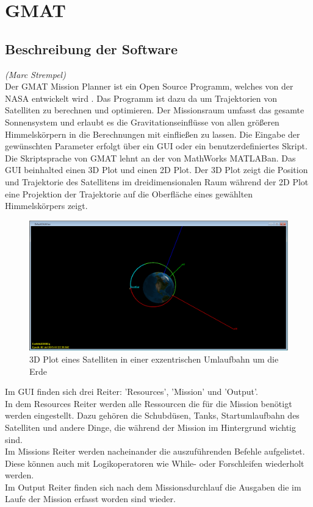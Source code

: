 			
\section{GMAT}
		\subsection{Beschreibung der Software}
		\hfill\emph{(Marc Strempel)}\\
Der GMAT Mission Planner ist ein Open Source Programm, welches von der NASA entwickelt wird \cite{Hughes.}. Das Programm ist dazu da um Trajektorien von Satelliten zu berechnen und optimieren. Der Missionsraum umfasst das gesamte Sonnensystem und erlaubt es die Gravitationseinflüsse von allen größeren Himmelskörpern in die Berechnungen mit einfließen zu lassen. 
Die Eingabe der gewünschten Parameter erfolgt über ein GUI oder ein benutzerdefiniertes Skript. Die Skriptsprache von GMAT lehnt an der von MathWorks MATLAB\textregistered \space an.
Das GUI beinhalted einen 3D Plot und einen 2D Plot. Der 3D Plot zeigt die Position und Trajektorie des Satellitens im dreidimensionalen Raum während der 2D Plot eine Projektion der Trajektorie auf die Oberfläche eines gewählten Himmelskörpers zeigt.

\begin{figure}[!h]
	\centering
		\includegraphics[width=1.00\textwidth]{graphics/GMAT/GMAT_OrbitView2.PNG}
		\caption{3D Plot eines Satelliten in einer exzentrischen Umlaufbahn um die Erde}
			\label{fig:OrbitView2}
\end{figure}


	Im GUI finden sich drei Reiter: ’Resources’, ’Mission’ und ’Output’.\\
In dem Resources Reiter werden alle Ressourcen die für die Mission benötigt werden eingestellt. Dazu gehören die Schubdüsen, Tanks, Startumlaufbahn des Satelliten und andere Dinge, die während der Mission im Hintergrund wichtig sind.\\
Im Missions Reiter werden nacheinander die auszuführenden Befehle aufgelistet. Diese können auch mit Logikoperatoren wie While- oder Forschleifen wiederholt werden.\\
Im Output Reiter finden sich nach dem Missionsdurchlauf die Ausgaben die im Laufe der Mission erfasst worden sind wieder. 


